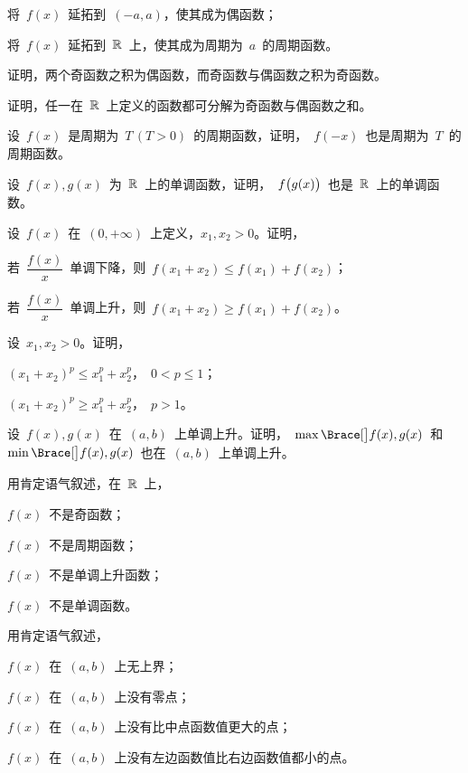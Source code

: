 \begin{exercise}
\begin{exlist}
  \item 将~$f(x)$~延拓到~$(-a,a)$，使其成为偶函数；
  \item 将~$f(x)$~延拓到~$\mathbb{R}$~上，使其成为周期为~$a$~的周期函数。
\end{exlist}
\item 证明，两个奇函数之积为偶函数，而奇函数与偶函数之积为奇函数。
\item 证明，任一在~$\mathbb{R}$~上定义的函数都可分解为奇函数与偶函数之和。
\item 设~$f(x)$~是周期为~$T\,(T>0)$~的周期函数，证明，~$f(-x)$~也是周期为~$T$~的周期函数。
\item 设~$f(x),g(x)$~为~$\mathbb{R}$~上的单调函数，证明，~$f\bigl\lparen g(x)\bigr\rparen$~也是~$\mathbb{R}$~上的单调函数。
\item 设~$f(x)$~在~$(0,+\infty)$~上定义，$x_1,x_2>0$。证明，
\begin{exlist}
  \item 若~$\dfrac{f(x)}x$~单调下降，则~$f(x_1+x_2)\leq f(x_1)+f(x_2)$；
  \item 若~$\dfrac{f(x)}x$~单调上升，则~$f(x_1+x_2)\geq f(x_1)+f(x_2)$。
\end{exlist}
\item 设~$x_1,x_2>0$。证明，
\begin{exlistcols}
  \item $(x_1+x_2)^p\leq x_1^p+x_2^p$，~$0<p\leq1$；
  \item $(x_1+x_2)^p\geq x_1^p+x_2^p$，~$p>1$。
\end{exlistcols}
\item 设~$f(x),g(x)$~在~$(a,b)$~上单调上升。证明，~$\max\Braceb{f(x),g(x)}$~和~$\min\Braceb{f(x),g(x)}$~也在~$(a,b)$~上单调上升。
\item 用肯定语气叙述，在~$\mathbb{R}$~上，
\begin{exlistcols}
  \item $f(x)$~不是奇函数；
  \item $f(x)$~不是周期函数；
  \item $f(x)$~不是单调上升函数；
  \item $f(x)$~不是单调函数。
\end{exlistcols}
\item 用肯定语气叙述，
\begin{exlistcols}
  \item $f(x)$~在~$(a,b)$~上无上界；
  \item $f(x)$~在~$(a,b)$~上没有零点；
  \item $f(x)$~在~$(a,b)$~上没有比中点函数值更大的点；
  \item $f(x)$~在~$(a,b)$~上没有左边函数值比右边函数值都小的点。
\end{exlistcols}
\end{exercise}

